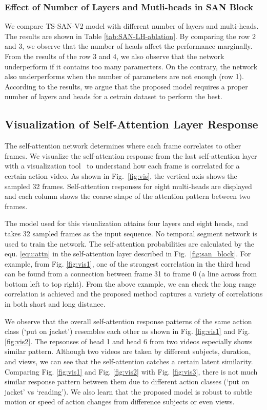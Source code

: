 \documentclass[10pt,twocolumn,letterpaper]{article}
\begin{document}
\subsubsection{Effect of Number of Layers and Mutli-heads in SAN Block}
We compare TS-SAN-V2 model with different number of layers and multi-heads. The results are shown in Table \ref{tab:SAN-LH-ablation}. By comparing the row 2 and 3, we observe that the number of heads affect the performance marginally. 
From the results of the row 3 and 4, we also observe that the network underperform if it contains too many paramerters. 
On the contrary, the network also underperforms when the number of parameters are not enough (row 1).
According to the results, we argue that the proposed model requires a proper number of layers and heads for a cetrain dataset to perform the best.



\subsection{Visualization of Self-Attention Layer Response}



The self-attention network determines where each frame correlates to other frames.
We visualize the self-attention response from the last self-attention layer with a visualization tool~\cite{vis} to understand how each frame is correlated for a certain action video.
As shown in Fig.~\ref{fig:vis}, the vertical axis shows the sampled 32 frames. Self-attention responses for eight multi-heads are displayed and each column shows the coarse shape of the attention pattern between two frames.

The model used for this visualization attains four layers and eight heads, and takes 32 sampled frames as the input sequence. No temporal segment network is used to train the network.
The self-attention probabilities are calculated by the equ. \ref{equ:attn} in the self-attention layer described in Fig.~\ref{fig:san_block}.
For example, from Fig. \ref{fig:vis1}, one of the strongest correlation in the third head can be found from a connection between frame 31 to frame 0 (a line across from bottom left to top right). 
From the above example, we can check the long range correlation is achieved and the proposed method captures a variety of correlations in both short and long distance.


We observe that the overall self-attention response patterns of the same action class (`put on jacket') resembles each other as shown in Fig. \ref{fig:vis1} and Fig. \ref{fig:vis2}. The repsonses of head 1 and head 6 from two videos especially shows similar pattern. Although two videos are taken by different subjects, duration, and views, we can see that the self-attention catches a certain latent similarity.
Comparing Fig. \ref{fig:vis1} and Fig. \ref{fig:vis2} with Fig. \ref{fig:vis3}, there is not much similar response pattern between them due to different action classes (`put on jacket' vs `reading').
We also learn that the proposed model is robust to subtle motion or speed of action changes from difference subjects or even views. 
\end{document}
